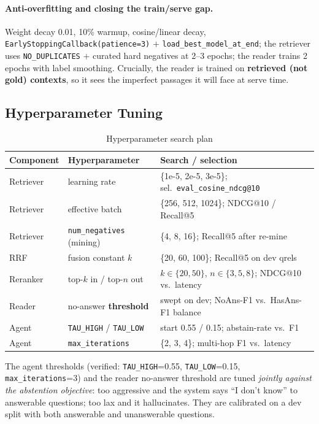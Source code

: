 \documentclass[12pt,a4paper]{article}
\begin{document}
\paragraph{Anti-overfitting and closing the train/serve gap.} Weight decay 0.01, 10\% warmup, cosine/linear decay, \texttt{EarlyStoppingCallback(patience=3)} $+$ \texttt{load\_best\_model\_at\_end}; the retriever uses \texttt{NO\_DUPLICATES} $+$ curated hard negatives at 2--3 epochs; the reader trains 2 epochs with label smoothing. Crucially, the reader is trained on \textbf{retrieved (not gold) contexts}, so it sees the imperfect passages it will face at serve time.

\subsection{Hyperparameter Tuning}

\begin{table}[H]
\centering
\caption{Hyperparameter search plan}
\small
\begin{tabular}{lll}
\toprule
\textbf{Component} & \textbf{Hyperparameter} & \textbf{Search / selection} \\
\midrule
Retriever & learning rate & \{1e-5, 2e-5, 3e-5\}; sel.\ \texttt{eval\_cosine\_ndcg@10} \\
Retriever & effective batch & \{256, 512, 1024\}; NDCG@10 / Recall@5 \\
Retriever & \texttt{num\_negatives} (mining) & \{4, 8, 16\}; Recall@5 after re-mine \\
RRF & fusion constant $k$ & \{20, 60, 100\}; Recall@5 on dev qrels \\
Reranker & top-$k$ in / top-$n$ out & $k\in\{20,50\}$, $n\in\{3,5,8\}$; NDCG@10 vs.\ latency \\
Reader & no-answer \textbf{threshold} & swept on dev; NoAns-F1 vs.\ HasAns-F1 balance \\
Agent & \texttt{TAU\_HIGH} / \texttt{TAU\_LOW} & start 0.55 / 0.15; abstain-rate vs.\ F1 \\
Agent & \texttt{max\_iterations} & \{2, 3, 4\}; multi-hop F1 vs.\ latency \\
\bottomrule
\end{tabular}
\end{table}

The agent thresholds (verified: \texttt{TAU\_HIGH}=0.55, \texttt{TAU\_LOW}=0.15, \texttt{max\_iterations}=3) and the reader no-answer threshold are tuned \emph{jointly against the abstention objective}: too aggressive and the system says ``I don't know'' to answerable questions; too lax and it hallucinates. They are calibrated on a dev split with both answerable and unanswerable questions.
\end{document}
